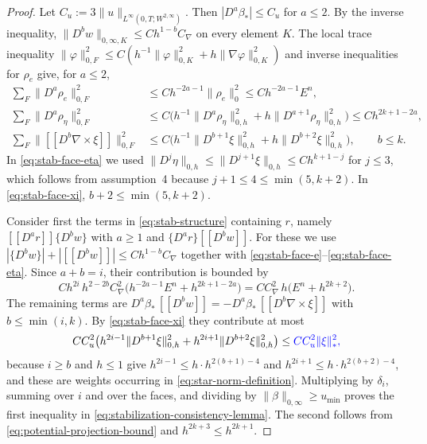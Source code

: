 \documentclass[11pt]{article}
\theoremstyle{remark}\newtheorem{remark}{Remark}
\theoremstyle{plain}
\newcommand{\new}[1]{{\color{blue}#1}}
\begin{document}
\begin{proof}
 Let $C_u:=3\|u\|_{L^\infty(0,T;W^{2,\infty})}$. Then $|D^a\beta_*|\le C_u$ for $a\le2$. By the inverse inequality, $\|D^bw\|_{0,\infty,K}\le Ch^{1-b}C_\nabla$ on every element $K$. The local trace inequality $\|\varphi\|_{0,F}^2\le C(h^{-1}\|\varphi\|_{0,K}^2+h\|\nabla\varphi\|_{0,K}^2)$ and inverse inequalities for $\rho_e$ give, for $a\le2$,
\begin{align}
\sum_{F}\|D^a\rho_e\|_{0,F}^2&\le Ch^{-2a-1}\|\rho_e\|_0^2\le Ch^{-2a-1}E^n,\label{eq:stab-face-e}\\
\sum_{F}\|D^a\rho_\eta\|_{0,F}^2&\le C\big(h^{-1}\|D^a\rho_\eta\|_{0,h}^2+h\|D^{a+1}\rho_\eta\|_{0,h}^2\big)\le Ch^{2k+1-2a},\label{eq:stab-face-eta}\\
\sum_{F}\|[\![D^b\nabla\times\xi]\!]\|_{0,F}^2&\le C\big(h^{-1}\|D^{b+1}\xi\|_{0,h}^2+h\|D^{b+2}\xi\|_{0,h}^2\big),\qquad b\le k.\label{eq:stab-face-xi}
\end{align}
In \eqref{eq:stab-face-eta} we used $\|D^j\eta\|_{0,h}\le\|D^{j+1}\xi\|_{0,h}\le Ch^{k+1-j}$ for $j\le3$, which follows from assumption~4 because $j+1\le4\le\min(5,k+2)$. In \eqref{eq:stab-face-xi}, $b+2\le\min(5,k+2)$.

Consider first the terms in \eqref{eq:stab-structure} containing $r$, namely $[\![D^ar]\!]\{D^bw\}$ with $a\ge1$ and $\{D^ar\}[\![D^bw]\!]$. For these we use $|\{D^bw\}|+|[\![D^bw]\!]|\le Ch^{1-b}C_\nabla$ together with \eqref{eq:stab-face-e}--\eqref{eq:stab-face-eta}. Since $a+b=i$, their contribution is bounded by
\[
Ch^{2i}\,h^{2-2b}C_\nabla^2\big(h^{-2a-1}E^n+h^{2k+1-2a}\big)=CC_\nabla^2\,h\big(E^n+h^{2k+2}\big).
\]
The remaining terms are $D^a\beta_*\,[\![D^bw]\!]=-D^a\beta_*\,[\![D^b\nabla\times\xi]\!]$ with $b\le\min(i,k)$. By \eqref{eq:stab-face-xi} they contribute at most
\[
CC_u^2\big(h^{2i-1}\|D^{b+1}\xi\|_{0,h}^2+h^{2i+1}\|D^{b+2}\xi\|_{0,h}^2\big)
\le\new{CC_u^2\|\xi\|_*^2,}
\]
because $i\ge b$ and $h\le1$ give \new{$h^{2i-1}\le h\cdot h^{2(b+1)-4}$ and $h^{2i+1}\le h\cdot h^{2(b+2)-4}$}, and these are weights occurring in \eqref{eq:star-norm-definition}. Multiplying by $\delta_i$, summing over $i$ and over the faces, and dividing by $\|\beta\|_{0,\infty}\ge u_{\min}$ proves the first inequality in \eqref{eq:stabilization-consistency-lemma}. The second follows from \eqref{eq:potential-projection-bound} \new{and $h^{2k+3}\le h^{2k+1}$}.
\end{proof}
\end{document}
